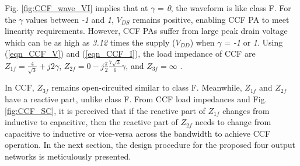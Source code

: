 \documentclass[conference]{IEEEtran}
\begin{document}

Fig. \ref{fig:CCF_wave_VI} implies that at $\gamma$ = \textit{0}, the waveform is like class F. For the $\gamma$ values between \textit{-1} and \textit{1}, $V_{DS}$ remains positive, enabling CCF PA to meet linearity requirements. However, CCF PAs suffer from large peak drain voltage which can be as high as \textit{3.12} times the supply ($V_{DD}$) when $\gamma$ = \textit{-1} or \textit{1}. Using (\ref{eqn_CCF_V}) and (\ref{eqn_CCF_I}), the load impedance of CCF  are $Z_{1f}=\frac{4}{\sqrt{3}}+j 2 \gamma$, $Z_{2f}=0-j \frac{\pi}{2} \frac{7 \sqrt{3}}{6} \gamma$, and $Z_{3f}=\infty$ \cite{CCFDesign_ali}.


In CCF, $Z_{3f}$ remains open-circuited similar to class F. Meanwhile, $Z_{1f}$ and $Z_{2f}$ have a reactive part, unlike class F. From CCF load impedances and Fig. \ref{fig:CCF_SC}, it is perceived that if the reactive part of $Z_{1f}$ changes from inductive to capacitive, then the reactive part of $Z_{2f}$  needs to change from capacitive to inductive or vice-versa across the bandwidth to achieve CCF operation. In the next section, the design procedure for the proposed four output networks is meticulously presented. 

\end{document}
